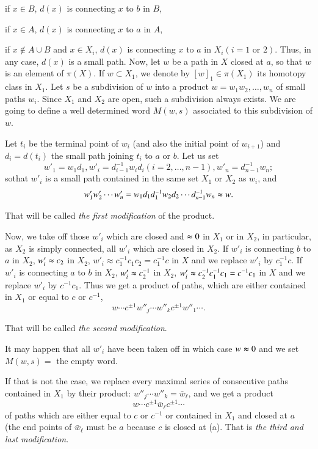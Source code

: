 if  $x \in B$, $d(x)$ is connecting  $x$  to  $b$  in $B$,  

if  $x \in A$, $d(x)$ is connecting  $x$  to  $a$  in $A$, 
 
if  $x \not\in A \cup B$  and  $x \in X_i$, $d(x)$  is connecting  $x$  to
$a$ in $X_i (i =1 \text{ or } 2)$. Thus, in any case, $d(x)$ is a
small path. Now, let $w$ be a path in $X$ closed at $a$, so that $w$
is an element of $\pi (X)$. If $w \subset X_1$, we  denote by
$[w]_1 \in \pi (X_1)$ its homotopy class in $X_1$. Let $s$ be a
subdivision of $w$ into a product $w = w_1 w_2 , \ldots, w_n$ of small
paths $w_i$. Since $X_1$ and $X_2$ are open, such a subdivision always
exists. We are going to define a well determined word $M(w,s)$
associated to this subdivision of $w$. 

 Let $t_i$ be the terminal point of $w_i$ (and also the initial point
 of  $w_{i +1}$) and $d_i = d(t_i)$ the small path joining $t_i$ to $a$
 or $b$. Let us set 
 $$
 w'_1 = w_1 d_1, w'_i = d^{-1}_{i -1} w_i d_i (i =2, \ldots, n-1), 
 w'_n = d^{-1}_{n-1} w_n ; 
 $$  
 so\pageoriginale that $w'_i$ is a small path contained in the same
 set $X_1$ or $X_2$ as $w_i$, and   
 $$
 w'_1 w'_2 \cdots w'_n = w_1 d_1 d^{-1}_1 w_2 d_2 \cdots d^{-1}_{n-1}
 w_n \thickapprox w. 
 $$

 That will be called \textit{the first modification} of the product. 
 
 Now, we take off those $w'_i$ which are closed and $\thickapprox 0$
 in $X_1$ or in $X_2$, in particular, as $X_2$ is simply connected,
 all $w'_i$ which are closed in $X_2$. If $w'_i$ is connecting $b$ to
 $a$ in $X_2$,  $w'_i \thickapprox c_2$ in $X_2$, $w'_i \approx
 c^{-1}_1 c_1 c_2 = c^{-1}_1 c$ in $X$ and we replace $w'_i$  by
 $c^{-1}_1 c$. If $w'_i$ is connecting $a$ 
 to $b$ in $X_2$, $w'_i \thickapprox c^{-1}_2$ in $X_2$, $w'_i
 \thickapprox c^{-1}_2 c^{-1}_1 c_1 =  c^{-1} c_1$ in $X$ and we
 replace $w'_i$ by $c^{-1} c_1$. Thus we get a product of paths, which
 are either contained in $X_1$ or equal to $c$ or $c^{-1}$, 
 $$
 w  \cdots c^{\pm 1} w''_j \cdots w''_k c^{ \pm 1} w''_1 \cdots. 
 $$ 
 
  That will be called \textit{the second modification}.
 
 It may  happen that all $w'_i$ have been taken off in which case $w
 \thickapprox 0$ and we set $M(w,s)=$ the empty word. 
 
 If that is not the case, we replace every maximal series of consecutive
 paths contained in $X_1$ by their product: $w''_j \cdots w''_k  =
 \bar{w}_\ell$, and we get a product 
 $$
 w \cdots c^{\pm 1} \bar{w}_\ell c^{\pm 1} \cdots
 $$ 
 of paths which are either equal to $c$ or $c^{-1}$ or contained in
 $X_1$ and closed at $a$ (the end points of $\bar{w}_\ell$ must be $a$
 because $c$ is closed at (a). That is  \textit{the third and last
   modification}. 
 
